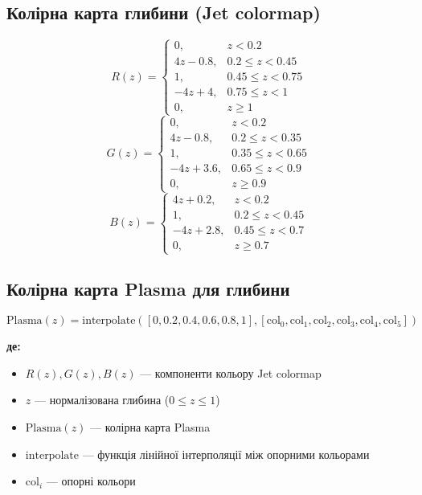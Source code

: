 \documentclass[14pt, a4paper]{extarticle}
\numberwithin{equation}{section}
\begin{document}
\subsection{Колірна карта глибини (Jet colormap)}
\begin{equation}
\boxed{R(z) = \begin{cases} 
0, & z < 0.2 \\ 
4z - 0.8, & 0.2 \leq z < 0.45 \\ 
1, & 0.45 \leq z < 0.75 \\ 
-4z + 4, & 0.75 \leq z < 1 \\ 
0, & z \geq 1 
\end{cases}} \tag{82}
\end{equation}
\begin{equation}
\boxed{G(z) = \begin{cases}
0, & z < 0.2 \\
4z - 0.8, & 0.2 \leq z < 0.35 \\
1, & 0.35 \leq z < 0.65 \\
-4z + 3.6, & 0.65 \leq z < 0.9 \\
0, & z \geq 0.9
\end{cases}} \tag{83}
\end{equation}
\begin{equation}
\boxed{B(z) = \begin{cases}
4z + 0.2, & z < 0.2 \\
1, & 0.2 \leq z < 0.45 \\
-4z + 2.8, & 0.45 \leq z < 0.7 \\
0, & z \geq 0.7
\end{cases}} \tag{84}
\end{equation}

\subsection{Колірна карта Plasma для глибини}
\begin{equation}
\boxed{\text{Plasma}(z) = \text{interpolate}([0,0.2,0.4,0.6,0.8,1], [\text{col}_0, \text{col}_1, \text{col}_2, \text{col}_3, \text{col}_4, \text{col}_5])} \tag{85}
\end{equation}

\textbf{де:}
\begin{itemize}
\item $R(z), G(z), B(z)$ — компоненти кольору Jet colormap
\item $z$ — нормалізована глибина ($0 \leq z \leq 1$)
\item $\text{Plasma}(z)$ — колірна карта Plasma
\item $\text{interpolate}$ — функція лінійної інтерполяції між опорними кольорами
\item $\text{col}_i$ — опорні кольори
\end{itemize}
\end{document}
